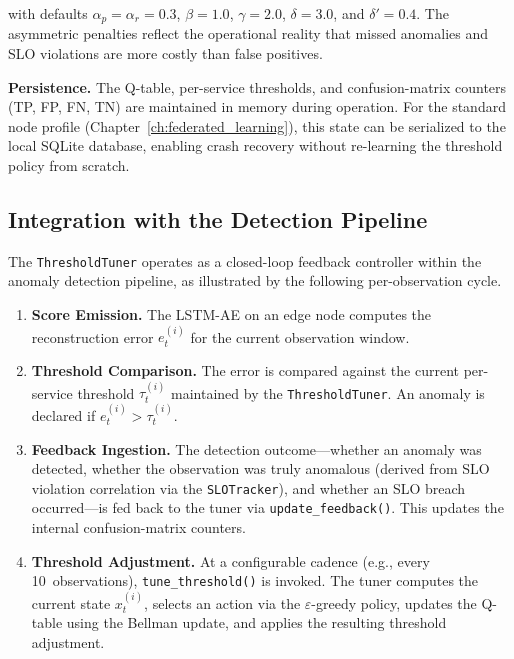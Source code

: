 with defaults $\alpha_p = \alpha_r = 0.3$, $\beta = 1.0$, $\gamma = 2.0$,
$\delta = 3.0$, and $\delta' = 0.4$. The asymmetric penalties reflect the
operational reality that missed anomalies and SLO violations are more costly
than false positives.

\textbf{Persistence.} The Q-table, per-service thresholds, and confusion-matrix
counters (TP, FP, FN, TN) are maintained in memory during operation. For the
standard node profile (Chapter~\ref{ch:federated_learning}), this state can be
serialized to the local SQLite database, enabling crash recovery without
re-learning the threshold policy from scratch.

\subsection{Integration with the Detection Pipeline}
\label{subsec:threshold_impl_integration}

The \texttt{ThresholdTuner} operates as a closed-loop feedback controller
within the anomaly detection pipeline, as illustrated by the following
per-observation cycle.

\begin{enumerate}
    \item \textbf{Score Emission.} The LSTM-AE on an edge node computes the
    reconstruction error $e_t^{(i)}$ for the current observation window.

    \item \textbf{Threshold Comparison.} The error is compared against the
    current per-service threshold $\tau_t^{(i)}$ maintained by the
    \texttt{ThresholdTuner}. An anomaly is declared if
    $e_t^{(i)} > \tau_t^{(i)}$.

    \item \textbf{Feedback Ingestion.} The detection outcome---whether an
    anomaly was detected, whether the observation was truly anomalous (derived
    from SLO violation correlation via the \texttt{SLOTracker}), and whether an
    SLO breach occurred---is fed back to the tuner via
    \texttt{update\_feedback()}. This updates the internal confusion-matrix
    counters.

    \item \textbf{Threshold Adjustment.} At a configurable cadence (e.g.,
    every 10~observations), \texttt{tune\_threshold()} is invoked. The tuner
    computes the current state $x_t^{(i)}$, selects an action via the
    $\varepsilon$-greedy policy, updates the Q-table using the Bellman update,
    and applies the resulting threshold adjustment.
\end{enumerate}

